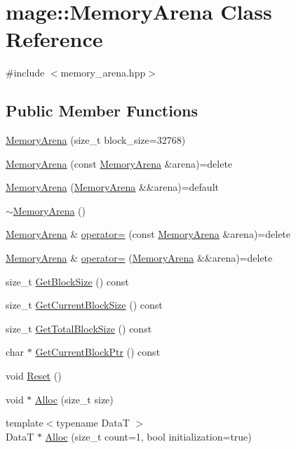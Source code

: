 \hypertarget{classmage_1_1_memory_arena}{}\section{mage\+:\+:Memory\+Arena Class Reference}
\label{classmage_1_1_memory_arena}


{\ttfamily \#include $<$memory\+\_\+arena.\+hpp$>$}

\subsection*{Public Member Functions}
\begin{DoxyCompactItemize}
\item 
\hyperlink{classmage_1_1_memory_arena_ac90beb8cf8dc42944a0fd6a4a9e8355c}{Memory\+Arena} (size\+\_\+t block\+\_\+size=32768)
\item 
\hyperlink{classmage_1_1_memory_arena_a1eca6fdacbd1226f4b21f443d118168b}{Memory\+Arena} (const \hyperlink{classmage_1_1_memory_arena}{Memory\+Arena} \&arena)=delete
\item 
\hyperlink{classmage_1_1_memory_arena_a55394fdcf83f260fec0af55e0b3a4a53}{Memory\+Arena} (\hyperlink{classmage_1_1_memory_arena}{Memory\+Arena} \&\&arena)=default
\item 
\hyperlink{classmage_1_1_memory_arena_acfee6fc205e2eaf6aeef4acf19948e6e}{$\sim$\+Memory\+Arena} ()
\item 
\hyperlink{classmage_1_1_memory_arena}{Memory\+Arena} \& \hyperlink{classmage_1_1_memory_arena_a7e7799f859c55435714933972ecb8b95}{operator=} (const \hyperlink{classmage_1_1_memory_arena}{Memory\+Arena} \&arena)=delete
\item 
\hyperlink{classmage_1_1_memory_arena}{Memory\+Arena} \& \hyperlink{classmage_1_1_memory_arena_aa4b80a917a838a1ca3788f906723d273}{operator=} (\hyperlink{classmage_1_1_memory_arena}{Memory\+Arena} \&\&arena)=delete
\item 
size\+\_\+t \hyperlink{classmage_1_1_memory_arena_a0db28bd286a517a30acdc061ace0bf56}{Get\+Block\+Size} () const
\item 
size\+\_\+t \hyperlink{classmage_1_1_memory_arena_a2789bf0c58dee881662bbb0c5ba73e55}{Get\+Current\+Block\+Size} () const
\item 
size\+\_\+t \hyperlink{classmage_1_1_memory_arena_ac4be7fb4d5623d6f78b1576c7884883a}{Get\+Total\+Block\+Size} () const
\item 
char $\ast$ \hyperlink{classmage_1_1_memory_arena_ac856206614ef9890d500df207d12e863}{Get\+Current\+Block\+Ptr} () const
\item 
void \hyperlink{classmage_1_1_memory_arena_a117b74c7bd5dfb28dfdaae6cab253491}{Reset} ()
\item 
void $\ast$ \hyperlink{classmage_1_1_memory_arena_a2e63b11c535dbfefd69d071466be9ce1}{Alloc} (size\+\_\+t size)
\item 
{\footnotesize template$<$typename DataT $>$ }\\DataT $\ast$ \hyperlink{classmage_1_1_memory_arena_a6797843db400848170d0b448a8a7e3b5}{Alloc} (size\+\_\+t count=1, bool initialization=true)
\end{DoxyCompactItemize}
